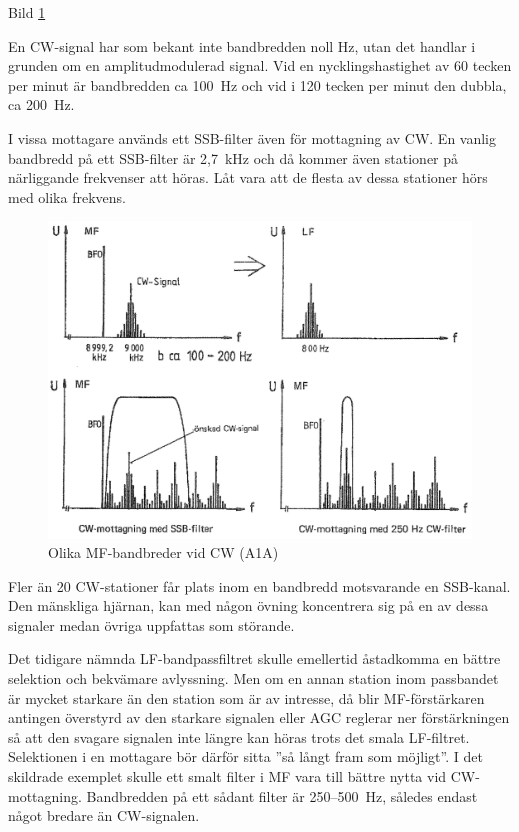 Bild \ref{fig:bildII4-28}

En CW-signal har som bekant inte bandbredden noll Hz, utan det handlar
i grunden om en amplitudmodulerad signal. Vid en nycklingshastighet av
60 tecken per minut är bandbredden ca 100~Hz och vid i 120 tecken per minut
den dubbla, ca 200~Hz.

I vissa mottagare används ett SSB-filter även för mottagning av CW. En
vanlig bandbredd på ett SSB-filter är 2,7~kHz och då kommer även
stationer på närliggande frekvenser att höras. Låt vara att de flesta
av dessa stationer hörs med olika frekvens.

\begin{figure}
  \includegraphics[width=\textwidth]{images/cropped_pdfs/bild_2_4-28.pdf}
  \caption{Olika MF-bandbreder vid CW (A1A)}
  \label{fig:bildII4-28}
\end{figure}

Fler än 20 CW-stationer får plats inom en bandbredd motsvarande en
SSB-kanal. Den mänskliga hjärnan, kan med någon övning koncentrera sig
på en av dessa signaler medan övriga uppfattas som störande.

Det tidigare nämnda LF-bandpassfiltret skulle emellertid åstadkomma en
bättre selektion och bekvämare avlyssning. Men om en annan station
inom passbandet är mycket starkare än den station som är av intresse,
då blir MF-förstärkaren antingen överstyrd av den starkare signalen
eller AGC reglerar ner förstärkningen så att den svagare signalen inte
längre kan höras trots det smala LF-filtret. Selektionen i en
mottagare bör därför sitta ''så långt fram som möjligt''. I det
skildrade exemplet skulle ett smalt filter i MF vara till bättre nytta
vid CW-mottagning. Bandbredden på ett sådant filter är 250--500~Hz,
således endast något bredare än CW-signalen.

